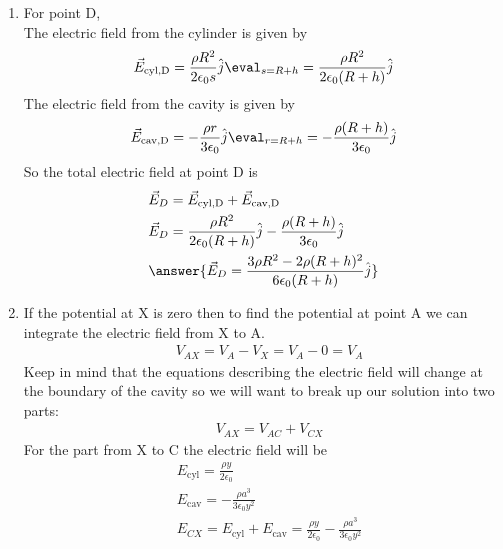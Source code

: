 {\begin{enumerate}
\[\vec{E}_\text{cyl,C}=\frac{\rho s}{2\epsilon_0}\hat{j}\eval_{s=a}=\frac{\rho a}{2\epsilon_0}\hat{j}\]
The electric field from the cavity is given by
\[\vec{E}_\text{cav,C}=-\frac{\rho r}{3\epsilon_0}\hat{j}\eval_{r=a}=-\frac{\rho a}{3\epsilon_0}\hat{j}\]
So the total electric field at point C is
\begin{align*}
    &\vec{E}_C=\vec{E}_\text{cyl,C}+\vec{E}_\text{cav,C}\\
    &\vec{E}_C=\frac{\rho a}{2\epsilon_0}\hat{j}-\frac{\rho a}{3\epsilon_0}\hat{j}\\
    &\answer{\vec{E}_C=\frac{\rho a}{6\epsilon_0}\hat{j}}
\end{align*}
\item For point D,\\
The electric field from the cylinder is given by
\[\vec{E}_\text{cyl,D}=\frac{\rho R^2}{2\epsilon_0s}\hat{j}\eval_{s=R+h}=\frac{\rho R^2}{2\epsilon_0(R+h)}\hat{j}\]
The electric field from the cavity is given by
\[\vec{E}_\text{cav,D}=-\frac{\rho r}{3\epsilon_0}\hat{j}\eval_{r=R+h}=-\frac{\rho (R+h)}{3\epsilon_0}\hat{j}\]
So the total electric field at point D is
\begin{align*}
    &\vec{E}_D=\vec{E}_\text{cyl,D}+\vec{E}_\text{cav,D}\\
    &\vec{E}_D=\frac{\rho R^2}{2\epsilon_0(R+h)}\hat{j}-\frac{\rho (R+h)}{3\epsilon_0}\hat{j}\\
    &\answer{\vec{E}_D=\frac{3\rho R^2-2\rho(R+h)^2}{6\epsilon_0(R+h)}\hat{j}}
\end{align*}
\item If the potential at X is zero then to find the potential at point A we can integrate the electric field from X to A.
\begin{align*}
    &V_{AX}=V_A-V_X=V_A-0=V_A
\end{align*}
Keep in mind that the equations describing the electric field will change at the boundary of the cavity so we will want to break up our solution into two parts:
\begin{align*}
    &V_{AX}=V_{AC}+V_{CX}
\end{align*}
For the part from X to C the electric field will be
\begin{align*}
    &E_\text{cyl}=\frac{\rho y}{2\epsilon_0}\\
    &E_\text{cav}=-\frac{\rho a^3}{3\epsilon_0y^2}\\
    &E_{CX}=E_\text{cyl}+E_\text{cav}=\frac{\rho y}{2\epsilon_0}-\frac{\rho a^3}{3\epsilon_0y^2}
\end{align*}

\end{enumerate}}
